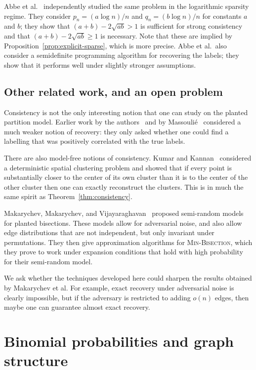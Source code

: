 \documentclass[EJP]{ejpecp}
\newcommand{\1}[1]{\mathbbm{1}_{\{#1\}}}
\begin{document}
Abbe et al.~\cite{AbBaHa:14} independently
studied the same problem in the logarithmic sparsity regime. They consider
$p_n = (a \log n)/n$ and $q_n = (b \log n) / n$ for constants $a$ and $b$;
they show that $(a+b) - 2\sqrt{ab} > 1$ is
sufficient for strong consistency and that
$(a+b) - 2\sqrt{ab} \ge 1$ is necessary. Note that these are implied
by Proposition~\ref{prop:explicit-sparse}, which is more precise. 
Abbe et al.\ also consider a semidefinite programming algorithm
for recovering the labels; they show that it performs well under
slightly stronger assumptions.

\subsection{Other related work, and an open problem}

Consistency is not the only interesting notion that one can study
on the planted partition model. Earlier work by the
authors~\cite{MoNeSl:13,MoNeSl:14} and by Massouli\'e~\cite{Massoulie:13}
considered a much weaker notion of recovery: they only asked whether
one could find a labelling that was positively correlated with the
true labels.

There are also model-free notions of consistency. Kumar and
Kannan~\cite{KumarKannan:10} considered a deterministic spatial clustering
problem and showed that if every point is substantially closer to the
center of its own cluster than it is to the center of the other cluster
then one can exactly reconstruct the clusters. This is in much the same
spirit as Theorem~\ref{thm:consistency}.

Makarychev, Makarychev, and Vijayaraghavan~\cite{MaMaVi:12,MaMaVi:14}
proposed semi-random models for planted bisections. These models
allow for adversarial noise, and also allow edge distributions that
are not independent, but only invariant under permutations.
They then give approximation algorithms for \textsc{Min-Bisection},
which they prove to work under expansion conditions that hold
with high probability for their semi-random model.

We ask whether the techniques developed here could sharpen the results
obtained by Makarychev et al. For example, exact recovery under adversarial
noise is clearly impossible, but if the adversary is restricted to adding $o(n)$
edges, then maybe one can guarantee almost exact recovery.



\section{Binomial probabilities and graph structure}
\end{document}
